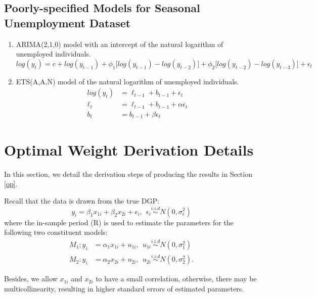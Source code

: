 \documentclass{monashthesis}
\begin{document}
\hypertarget{poorly-specified-models-for-seasonal-unemployment-dataset}{%
\subsection{Poorly-specified Models for Seasonal Unemployment Dataset}\label{poorly-specified-models-for-seasonal-unemployment-dataset}}

\begin{enumerate}
\def\labelenumi{\arabic{enumi}.}
\item
  ARIMA(2,1,0) model with an intercept of the natural logarithm of unemployed individuals.
  \begin{equation*}
  log(y_t) = c + log(y_{t-1}) + \phi_1\big[log(y_{t-1})-log(y_{t-2})\big] + \phi_2\big[log(y_{t-2})-log(y_{t-3})\big] + \epsilon_t
  \end{equation*}
\item
  ETS(A,A,N) model of the natural logarithm of unemployed individuals.
  \begin{align*}
  log(y_t) &= \ell_{t-1} + b_{t-1} + \epsilon_t \\
  \ell_t &= \ell_{t-1} + b_{t-1} + \alpha \epsilon_t \\
  b_t &= b_{t-1} + \beta \epsilon_t
  \end{align*}
\end{enumerate}

\hypertarget{detail}{%
\section{Optimal Weight Derivation Details}\label{detail}}

In this section, we detail the derivation steps of producing the results in Section \ref{op}.

Recall that the data is drawn from the true DGP:
\[y_i = \beta_1 x_{1i} + \beta_2 x_{2i} + \epsilon_i, \ \ \epsilon_i \stackrel{i.i.d}{\sim} N(0,\sigma^2_{\epsilon}) \]
where the in-sample period (R) is used to estimate the parameters for the following two constituent models:
\begin{align*}
M_1: y_i &= \alpha_1 x_{1i} + u_{1i}, \ \ u_{1i} \stackrel{i.i.d}{\sim} N(0,\sigma^2_1) \\
M_2: y_i &= \alpha_2 x_{2i} + u_{2i}, \ \ u_{2i} \stackrel{i.i.d}{\sim} N(0,\sigma^2_2).
\end{align*}

Besides, we allow \(x_{1i}\) and \(x_{2i}\) to have a small correlation, otherwise, there may be multicollinearity, resulting in higher standard errors of estimated parameters.
\end{document}
